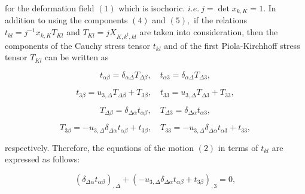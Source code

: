 \documentclass[8pt,a4paper]{article}
\begin{document}
for the deformation field $(1)$ which is isochoric. $\displaystyle i.e.\ j=\det x_{k,K}={1.}$ In addition to using the components $(4)$ and $(5),$ if the relations $t_{kl}=j^{-1}x_{k,K}T_{Kl}$ and $T_{Kl}=jX_{K,k^{t},kl}$ are taken into consideration, then the components of the Cauchy stress tensor $t_{kl}$ and of the first Piola-Kirchhoff stress tensor $T_{Kl}$ can be written as

\begin{center}
    \begin{equation*}
         \displaystyle t_{\alpha\beta}=\delta_{\alpha\Delta}T_{\Delta\beta},\quad t_{\alpha3}=\delta_{\alpha\Delta}T_{\Delta3},
    \end{equation*}
\end{center}

\begin{center}
    \begin{equation}
         \displaystyle t_{3\beta}=u_{3,\Delta}T_{\Delta\beta}+T_{3\beta},\quad t_{33}=u_{3,\Delta}T_{\Delta3}+T_{33},
    \end{equation}
\end{center}

\begin{center}
    \begin{equation*}
         \displaystyle T_{\Delta\beta}=\delta_{\Delta\alpha}t_{\alpha\beta},\quad T_{\Delta3}=\delta_{\Delta\alpha}t_{\alpha3},
    \end{equation*}
\end{center}

\begin{center}
    \begin{equation}
         \displaystyle T_{3\beta}=-u_{3,\Delta}\delta_{\Delta\alpha}t_{\alpha\beta}+t_{3\beta},\quad T_{33}=-u_{3,\Delta}\delta_{\Delta\alpha}t_{\alpha3}+t_{33},
    \end{equation}
\end{center}

respectively. Therefore, the equations of the motion $(2)$ in terms of $t_{kl}$ are expressed as follows:

\begin{center}
    \begin{equation*}
         \displaystyle (\delta_{\Delta\alpha}t_{\alpha\beta})_{,\Delta}+(-u_{3,\Delta}\delta_{\Delta\alpha}t_{\alpha\beta}+t_{3\beta})_{,3}=0,
    \end{equation*}
\end{center}
\end{document}
